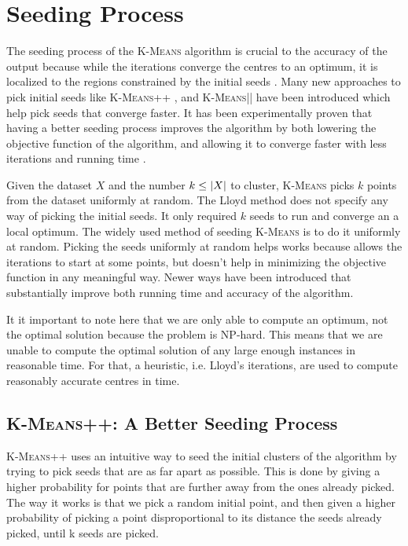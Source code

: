 \documentclass[12pt]{dalthesis}
\newcommand*{\kmeans}{\textsc{K-Means} } %
\newcommand*{\kmeansn}{\textsc{K-Means}} %
\DeclarePairedDelimiter\abs{\lvert}{\rvert}
\begin{document}
\section{Seeding Process}

The seeding process of the \kmeans algorithm is crucial to the accuracy of the output because while the iterations converge the centres to an optimum, it is localized to the regions constrained by the initial seeds \citep{arthur2007k}.
Many new approaches to pick initial seeds like \kmeansn++ \citep{arthur2007k}, and \kmeansn|| \citep{bahmani2012scalable} have been introduced which help pick seeds that converge faster. It has been experimentally proven that having a better seeding process improves the algorithm by both lowering the objective function of the algorithm, and allowing it to converge faster with less iterations and running time \citep{arthur2007k}.

Given the dataset $X$ and the number $k\leq \abs{X}$ to cluster, \kmeans picks $k$ points from the dataset uniformly at random. The Lloyd method does not specify any way of picking the initial seeds. It only required $k$ seeds to run and converge an a local optimum. The widely used method of seeding \kmeans  is to do it uniformly at random. Picking the seeds uniformly at random helps works because allows the iterations to start at some points, but doesn't help in minimizing the objective function in any meaningful way. Newer ways have been introduced that substantially improve both running time and accuracy of the algorithm.

It it important to note here that we are only able to compute an optimum, not the optimal solution because the problem is NP-hard\cite{mahajan2009planar}. This means that we are unable to compute the optimal solution of any large enough instances in reasonable time. For that, a heuristic, i.e. Lloyd's iterations, are used to compute reasonably accurate centres in time.

\subsection{\kmeansn++: A Better Seeding Process}
\kmeansn++ uses an intuitive way to seed the initial clusters of the algorithm by trying to pick seeds that are as far apart as possible. This is done by giving a higher probability for points that are further away from the ones already picked. The way it works is that we pick a random initial point, and then given a higher probability of picking a point disproportional to its distance the seeds already picked, until k seeds are picked\cite{arthur2007k}.
\end{document}
